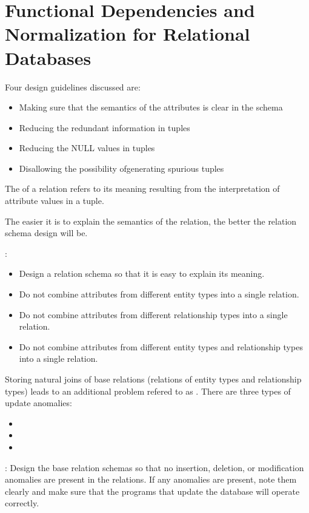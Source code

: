 \chapter{Functional Dependencies and Normalization for Relational Databases}


  \par Four design guidelines discussed are:

  \begin{itemize}
    \item Making sure that the semantics of the attributes is clear in the schema
    \item Reducing the redundant information in tuples
    \item Reducing the NULL values in tuples
    \item Disallowing the possibility ofgenerating spurious tuples
  \end{itemize}

    \par The  of a relation refers to its meaning resulting from the interpretation of attribute values in a tuple.
    \par The easier it is to explain the semantics of the relation, the better the relation schema design will be.
    \par {}:
    \begin{itemize}
      \item Design a relation schema so that it is easy to explain its meaning.
      \item Do not combine attributes from different entity types into a single relation.
      \item Do not combine attributes from different relationship types into a single relation.
      \item Do not combine attributes from different entity types and relationship types into a single relation.
    \end{itemize}

    \par Storing natural joins of base relations (relations of entity types and relationship types) leads to an additional problem refered to as . There are three types of update anomalies:
    \begin{itemize}
      \item {}
      \item {}
      \item {}
    \end{itemize}
    \par {}: Design the base relation schemas so that no insertion, deletion, or modification anomalies are present in the relations. If any anomalies are present, note them clearly and make sure that the programs that update the database will operate correctly.

